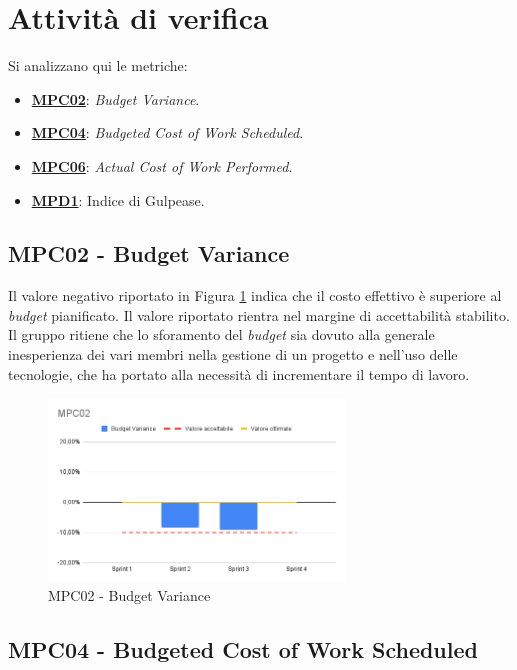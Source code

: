\section{Attività di verifica}
Si analizzano qui le metriche:
\begin{itemize}
    \item \hyperref[s:mpc02]{\textbf{MPC02}}\textbf{}: \textit{Budget Variance}.
    \item \hyperref[s:mpc04]{\textbf{MPC04}}\textbf{}: \textit{Budgeted Cost of Work Scheduled}.
    \item \hyperref[s:mpc06]{\textbf{MPC06}}\textbf{}: \textit{Actual Cost of Work Performed}.
    \item \hyperref[s:mpd1]{\textbf{MPD1}}\textbf{}: Indice di Gulpease.
\end{itemize}

\subsection{MPC02 - Budget Variance}
\label{s:mpc02}
Il valore negativo riportato in Figura \ref{fig:mpc02} indica che il costo effettivo è superiore al \textit{budget} pianificato.
Il valore riportato rientra nel margine di accettabilità stabilito. \\
Il gruppo ritiene che lo sforamento del \textit{budget} sia dovuto alla generale inesperienza dei vari membri nella gestione di un progetto e nell'uso delle tecnologie, che ha portato alla necessità di incrementare il tempo di lavoro.

\begin{figure}[htbp]
    \centering
    \includegraphics[width=0.7\textwidth]{img/MPC02.png}
    \caption{MPC02 - Budget Variance}
    \label{fig:mpc02}
\end{figure}


\newpage
\subsection{MPC04 - Budgeted Cost of Work Scheduled}
\label{s:mpc04}

